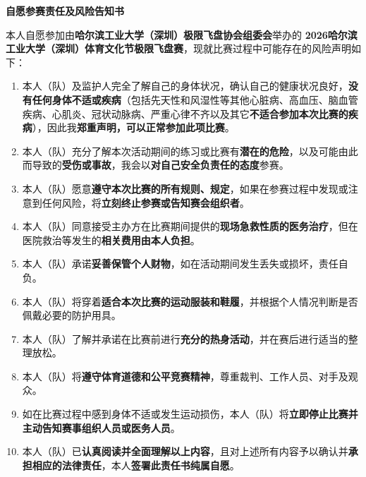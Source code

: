 \documentclass{article}
\begin{document}
\begin{center}
    \vspace*{0cm} %
    {\fontsize{18pt}{28pt}\selectfont\textbf{自愿参赛责任及风险告知书}} %
    \vspace{0.5cm} %
\end{center}

本人自愿参加由\textbf{哈尔滨工业大学（深圳）极限飞盘协会组委会}举办的 \textbf{2026哈尔滨工业大学（深圳）体育文化节极限飞盘赛}，现就比赛过程中可能存在的风险声明如下：

\begin{enumerate} %
\item 本人（队）及监护人完全了解自己的身体状况，确认自己的健康状况良好，\textbf{没有任何身体不适或疾病}（包括先天性和风湿性等其他心脏病、高血压、脑血管疾病、心肌炎、冠状动脉病、严重心律不齐以及其它\textbf{不适合参加本次比赛的疾病}），因此我\textbf{郑重声明，可以正常参加此项比赛}。
\item 本人（队）充分了解本次活动期间的练习或比赛有\textbf{潜在的危险}，以及可能由此而导致的\textbf{受伤或事故}，我会以\textbf{对自己安全负责任的态度}参赛。
\item 本人（队）愿意\textbf{遵守本次比赛的所有规则、规定}，如果在参赛过程中发现或注意到任何风险，将\textbf{立刻终止参赛或告知赛会组织者}。
\item 本人（队）同意接受主办方在比赛期间提供的\textbf{现场急救性质的医务治疗}，但在医院救治等发生的\textbf{相关费用由本人负担}。
\item 本人（队）承诺\textbf{妥善保管个人财物}，如在活动期间发生丢失或损坏，责任自负。
\item 本人（队）将穿着\textbf{适合本次比赛的运动服装和鞋履}，并根据个人情况判断是否佩戴必要的防护用具。
\item 本人（队）了解并承诺在比赛前进行\textbf{充分的热身活动}，并在赛后进行适当的整理放松。
\item 本人（队）将\textbf{遵守体育道德和公平竞赛精神}，尊重裁判、工作人员、对手及观众。
\item 如在比赛过程中感到身体不适或发生运动损伤，本人（队）将\textbf{立即停止比赛并主动告知赛事组织人员或医务人员}。
\item 本人（队）已\textbf{认真阅读并全面理解以上内容}，且对上述所有内容予以确认并\textbf{承担相应的法律责任}，本人\textbf{签署此责任书纯属自愿}。
\end{enumerate}
\end{document}
